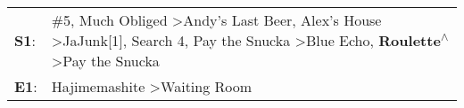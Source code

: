 \begin{supertabular}{p{0.03\textwidth}p{0.92\textwidth}}
 \textbf{S1}:  &  \#5\textsuperscript{}, \enspace Much Obliged\textsuperscript{} \textgreater \enspace Andy's Last Beer\textsuperscript{}, \enspace Alex's House\textsuperscript{} \textgreater \enspace JaJunk[1]\textsuperscript{}, \enspace Search 4\textsuperscript{}, \enspace Pay the Snucka\textsuperscript{} \textgreater \enspace Blue Echo\textsuperscript{}, \enspace \textbf{Roulette\textsuperscript{$\wedge$}} \textgreater \enspace Pay the Snucka\textsuperscript{}  \enspace  \\
 \textbf{E1}:  &                                                                                                                                                                                                                                                                                                                                                                               Hajimemashite\textsuperscript{} \textgreater \enspace Waiting Room\textsuperscript{}  \enspace  \\
\end{supertabular}
